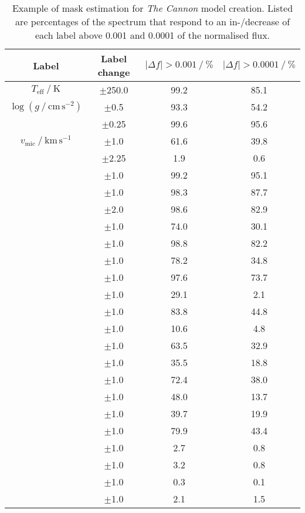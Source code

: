 \begin{table}
    \centering
    \caption{Example of mask estimation for \textit{The Cannon} model creation. Listed are percentages of the spectrum that respond to an in-/decrease of each label above 0.001 and 0.0001 of the normalised flux.}
    \label{tab:cannon_mask_percentage}
    \begin{tabular}{cccc}
    \hline \hline
    Label &  Label change & $\vert \Delta f \vert > 0.001~/~\%$ & $\vert \Delta f \vert > 0.0001~/~\%$ \\
    \hline
    $T_\mathrm{eff}~/~\mathrm{K}$ & $\pm$250.0 & 99.2 & 85.1 \\
    $\log (g~/~\mathrm{cm\,s^{-2}})$ & $\pm$0.5 & 93.3 & 54.2 \\
    [Fe/H] & $\pm$0.25 & 99.6 & 95.6 \\
    $v_\mathrm{mic}~/~\mathrm{km\,s^{-1}}$ & $\pm$1.0 & 61.6 & 39.8 \\
    [Li/Fe] & $\pm$2.25 & 1.9 & 0.6 \\
    [C/Fe] & $\pm$1.0 & 99.2 & 95.1 \\
    [N/Fe] & $\pm$1.0 & 98.3 & 87.7 \\
    [O/Fe] & $\pm$2.0 & 98.6 & 82.9 \\
    [Na/Fe] & $\pm$1.0 & 74.0 & 30.1 \\
    [Mg/Fe] & $\pm$1.0 & 98.8 & 82.2 \\
    [Al/Fe] & $\pm$1.0 & 78.2 & 34.8 \\
    [Si/Fe] & $\pm$1.0 & 97.6 & 73.7 \\
    [K/Fe] & $\pm$1.0 & 29.1 & 2.1 \\
    [Ca/Fe] & $\pm$1.0 & 83.8 & 44.8 \\
    [Sc/Fe] & $\pm$1.0 & 10.6 & 4.8 \\
    [Ti/Fe] & $\pm$1.0 & 63.5 & 32.9 \\
    [V/Fe] & $\pm$1.0 & 35.5 & 18.8 \\
    [Cr/Fe] & $\pm$1.0 & 72.4 & 38.0 \\
    [Mn/Fe] & $\pm$1.0 & 48.0 & 13.7 \\
    [Co/Fe] & $\pm$1.0 & 39.7 & 19.9 \\
    [Ni/Fe] & $\pm$1.0 & 79.9 & 43.4 \\
    [Cu/Fe] & $\pm$1.0 & 2.7 & 0.8 \\
    [Zn/Fe] & $\pm$1.0 & 3.2 & 0.8 \\
    [Rb/Fe] & $\pm$1.0 & 0.3 & 0.1 \\
    [Sr/Fe] & $\pm$1.0 & 2.1 & 1.5 \\

\end{tabular}
\end{table}
